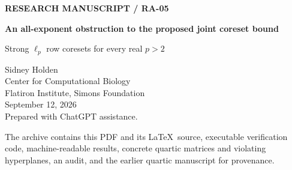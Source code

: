 \documentclass[11pt,letterpaper]{article}
\theoremstyle{definition}
\theoremstyle{remark}
\numberwithin{equation}{section}
\newcommand{\eps}{\varepsilon}
\newcommand{\littleO}{\widetilde O}
\begin{document}
\begin{titlepage}
\thispagestyle{empty}
{\small\sffamily\bfseries RESEARCH MANUSCRIPT / RA-05}\par
\vspace{0.65in}
{\LARGE\bfseries An all-exponent obstruction to the proposed joint coreset bound\par}
\vspace{0.2in}
{\large Strong $\ell_p$ row coresets for every real $p>2$\par}
\vspace{0.32in}
{\large Sidney Holden}\\
Center for Computational Biology\\
Flatiron Institute, Simons Foundation\\
September 12, 2026\\[6pt]
{\small Prepared with ChatGPT assistance.}
\vspace{0.32in}
\begin{abstract}
For the original-row, nonnegative-weight model in RA-05, let $S_p(k,\eps)$ be the worst-case minimum support of a strong coreset. We prove that, for every fixed real $p>2$ and all sufficiently large $k$,
\[
 S_p(k,\eps)\ge c_p\frac{k^{p/2}}{\eps^{\beta_p}+(\log k)/k},
 \qquad 0<\eps<\tfrac12,
\]
where $\beta_p=2$ for positive even integers $p\ge4$, and $\beta_p=2-2/p$ otherwise. This disproves the proposed bound
$\littleO_p(k^{p/2}/\eps+k/\eps^2)$ separately for every fixed $p>2$. For even $p$, it matches the cited upper bound up to logarithmic factors when $\eps\ge\sqrt{(\log k)/k}$. The proof combines a rectangular, well-conditioned derivative-evaluation matrix with a sparse-mean obstruction. A finite-difference argument handles noninteger powers without assuming that their derivative kernels are positive semidefinite. We also give a self-contained explicit quartic construction and reproducible finite checks.
\end{abstract}
\vspace{0.16in}
\noindent{}
\vfill
{\small The archive contains this PDF and its \LaTeX\ source, executable verification code, machine-readable results, concrete quartic matrices and violating hyperplanes, an audit, and the earlier quartic manuscript for provenance.}
\end{titlepage}
\tableofcontents
\newpage
\end{document}
